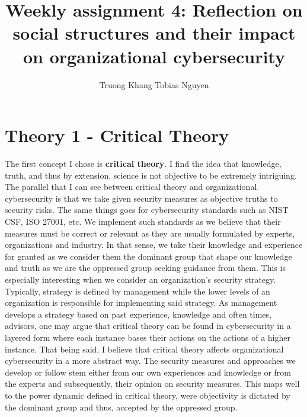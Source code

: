\documentclass[12pt]{article}
\title{Weekly assignment 4: Reflection on social structures and their impact on organizational cybersecurity}
\author{Truong Khang Tobias Nguyen}
\date{}
\begin{document}
\maketitle

\section{Theory 1 - Critical Theory}
The first concept I chose is \textbf{critical theory}. I find the idea that knowledge, truth, and thus by extension, science is not objective to be extremely intriguing. 
\newline
The parallel that I can see between critical theory and organizational cybersecurity is that we take given security measures as objective truths to security risks. The same things goes for cybersecurity standards such as NIST CSF, ISO 27001, etc. 
\newline
We implement such standards as we believe that their measures must be correct or relevant as they are usually formulated by experts, organizations and industry. In that sense, we take their knowledge and experience for granted as we consider them the dominant group that shape our knowledge and truth as we are the oppressed group seeking guidance from them.
\newline
This is especially interesting when we consider an organization's security strategy. Typically, strategy is defined by management while the lower levels of an organization is responsible for implementing said strategy. As management develops a strategy based on past experience, knowledge and often times, advisors, one may argue that critical theory can be found in cybersecurity in a layered form where each instance bases their actions on the actions of a higher instance.
\newline
That being said, I believe that critical theory affects organizational cybersecurity in a more abstract way. The security measures and approaches we develop or follow stem either from our own experiences and knowledge or from the experts and subsequently, their opinion on security measures. This maps well to the power dynamic defined in critical theory, were objectivity is dictated by the dominant group and thus, accepted by the oppressed group.
\end{document}
